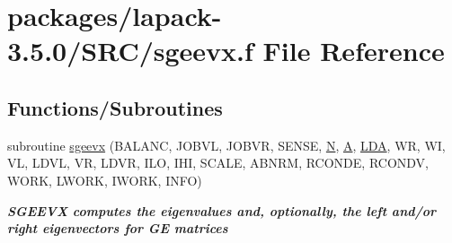 \hypertarget{sgeevx_8f}{}\section{packages/lapack-\/3.5.0/\+S\+R\+C/sgeevx.f File Reference}
\label{sgeevx_8f}
\subsection*{Functions/\+Subroutines}
\begin{DoxyCompactItemize}
\item 
subroutine \hyperlink{group__realGEeigen_gadf06d28b4793cbab21e898fcb713d5a5}{sgeevx} (B\+A\+L\+A\+N\+C, J\+O\+B\+V\+L, J\+O\+B\+V\+R, S\+E\+N\+S\+E, \hyperlink{polmisc_8c_a0240ac851181b84ac374872dc5434ee4}{N}, \hyperlink{classA}{A}, \hyperlink{example__user_8c_ae946da542ce0db94dced19b2ecefd1aa}{L\+D\+A}, W\+R, W\+I, V\+L, L\+D\+V\+L, V\+R, L\+D\+V\+R, I\+L\+O, I\+H\+I, S\+C\+A\+L\+E, A\+B\+N\+R\+M, R\+C\+O\+N\+D\+E, R\+C\+O\+N\+D\+V, W\+O\+R\+K, L\+W\+O\+R\+K, I\+W\+O\+R\+K, I\+N\+F\+O)
\begin{DoxyCompactList}\small\item\em {\bfseries  S\+G\+E\+E\+V\+X computes the eigenvalues and, optionally, the left and/or right eigenvectors for G\+E matrices} \end{DoxyCompactList}\end{DoxyCompactItemize}
